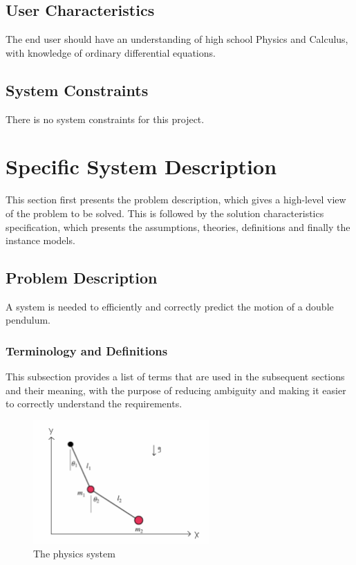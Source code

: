 \documentclass[12pt]{article}
\begin{document}
\subsection{User Characteristics}\label{sec_userChar}
The end user should have an understanding of high school Physics and Calculus, with knowledge of ordinary differential equations. 

\subsection{System Constraints}\label{sec_sysConstraints}
There is no system constraints for this project. 

\section{Specific System Description}\label{sec_specificSysDes}
This section first presents the problem description, which gives a high-level view of the problem to be solved. This is followed by the solution characteristics specification, which presents the assumptions, theories, definitions and finally the instance models. 

\subsection{Problem Description}\label{sec_problemDes}
A system is needed to efficiently and correctly predict the motion of a double pendulum. 

\subsubsection{Terminology and Definitions}\label{sec_termiAndDef}
This subsection provides a list of terms that are used in the subsequent sections and their meaning, with the purpose of reducing ambiguity and making it easier to correctly understand the requirements. 
\begin{figure}[h!]
\begin{center}
 \includegraphics[width=0.6\textwidth]{dp}
\caption{The physics system}
\label{Fig_physics system} 
\end{center}
\end{figure}
\end{document}
